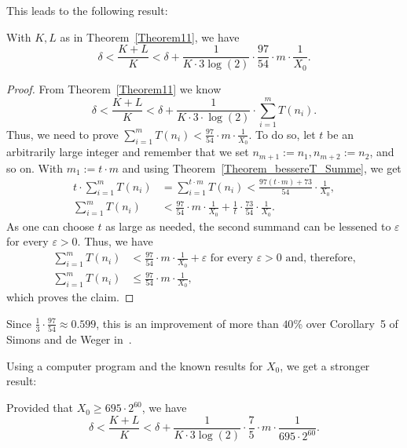 \documentclass[12pt,reqno]{article}
\begin{document}
This leads to the following result:
\begin{corollary}\label{Corollary_TSumme_ohneRestglied}
With $K, L$ as in Theorem~\ref{Theorem11}, we have 
\[\delta <\frac{K+L}{K}<\delta+\frac{1}{K \cdot 3 \log(2)} \cdot \frac{97}{54} \cdot m \cdot \frac{1}{X_0}.\]
\end{corollary}

\begin{proof}
From Theorem~\ref{Theorem11} we know
\[\delta<\frac{K+L}{K}<\delta+\frac{1}{K \cdot 3\cdot \log(2)} \cdot \sum_{i=1}^m T(n_i).\]
Thus, we need to prove $\sum_{i=1}^m T(n_i)< \tfrac{97}{54} \cdot m \cdot \tfrac{1}{X_0}$. To do so, let $t$ be an arbitrarily large integer and remember that we set $n_{m+1}:=n_1, n_{m+2}:=n_2$, and so on. With $m_1:=t\cdot m$ and using Theorem~\ref{Theorem_bessereT_Summe}, we get
\begin{align*}
t\cdot \sum_{i=1}^m T(n_i) &= \sum_{i=1}^{t\cdot m} T(n_i) < \frac{97 (t\cdot m) +73}{54} \cdot \frac{1}{X_0},\\
\sum_{i=1}^m T(n_i) &< \frac{97}{54} \cdot m \cdot \frac{1}{X_0} + \frac{1}{t} \cdot \frac{73}{54} \cdot \frac{1}{X_0}.
\end{align*}
As one can choose $t$ as large as needed,  the second summand can be lessened to $\varepsilon$ for every $\varepsilon>0$. Thus, we have
\begin{align*}
\sum_{i=1}^m T(n_i) &< \frac{97}{54} \cdot m \cdot \frac{1}{X_0} + \varepsilon \text{ for every $\varepsilon>0$ and, therefore,}\\
\sum_{i=1}^m T(n_i) &\leq  \frac{97}{54} \cdot m \cdot \frac{1}{X_0}, 
\end{align*}
which proves the claim.
\end{proof}

\begin{remark}
Since $\tfrac{1}{3} \cdot \tfrac{97}{54}\approx 0.599$, this is an improvement of more than $40$\% over Corollary~5 of Simons and de Weger in~\cite{SW-www}.
\end{remark}

Using a computer program and the known results for $X_0$, we get a stronger result:
\begin{corollary}\label{Computer_estimate_m_T}
Provided that $X_0\geq 695\cdot 2^{60}$, we have
\[\delta <\frac{K+L}{K}<\delta+\frac{1}{K \cdot 3 \log(2)} \cdot \frac{7}{5} \cdot m \cdot \frac{1}{695\cdot 2^{60}}.\]
\end{corollary}
\end{document}
